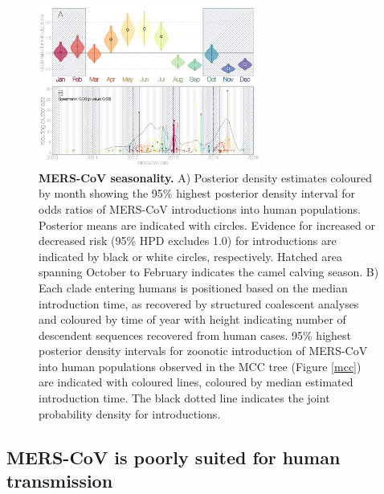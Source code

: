 \documentclass[11pt,oneside,letterpaper]{article}
\def\lmc#1{\textcolor{green}{[#1]}}
\begin{document}
\begin{figure}[h]
\centering
	\includegraphics[width=0.65\textwidth]{figures/mers_seasonality.png}
	\caption{\textbf{MERS-CoV seasonality.}
A) %
Posterior density estimates coloured by month showing the 95\% highest posterior density interval for odds ratios of MERS-CoV introductions into human populations.
Posterior means are indicated with circles.
Evidence for increased or decreased risk (95\% HPD excludes 1.0) for introductions are indicated by black or white circles, respectively.
Hatched area spanning October to February indicates the camel calving season.
B) Each clade entering humans is positioned based on the median introduction time, as recovered by structured coalescent analyses and coloured by time of year with height indicating number of descendent sequences recovered from human cases.
95\% highest posterior density intervals for zoonotic introduction of MERS-CoV into human populations observed in the MCC tree (Figure \ref{mcc}) are indicated with coloured lines, coloured by median estimated introduction time.
The black dotted line indicates the joint probability density for introductions.
	}
	\label{seasonality}
\end{figure}

%

\subsection*{MERS-CoV is poorly suited for human transmission}
\end{document}
